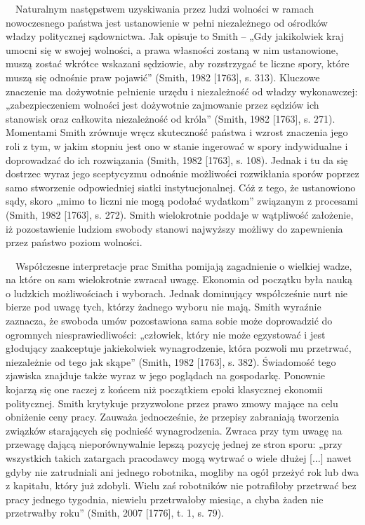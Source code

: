 \documentclass[a4paper]{article}
\begin{document}
 \ \ Naturalnym następstwem uzyskiwania przez ludzi wolności w ramach nowoczesnego państwa jest ustanowienie w pełni niezależnego od ośrodków władzy politycznej sądownictwa. Jak opisuje to Smith – „Gdy jakikolwiek kraj umocni się w swojej wolności, a prawa własności zostaną w nim ustanowione, muszą zostać wkrótce wskazani sędziowie, aby rozstrzygać te liczne spory, które muszą się odnośnie praw pojawić” \label{ref:RNDkH7t6CSI0T}(Smith, 1982 [1763], s. 313). Kluczowe znaczenie ma dożywotnie pełnienie urzędu i niezależność od władzy wykonawczej: „zabezpieczeniem wolności jest dożywotnie zajmowanie przez sędziów ich stanowisk oraz całkowita niezależność od króla” \label{ref:RNDQY5dE7difr}(Smith, 1982 [1763], s. 271). Momentami Smith zrównuje wręcz skuteczność państwa i wzrost znaczenia jego roli z tym, w jakim stopniu jest ono w stanie ingerować w spory indywidualne i doprowadzać do ich rozwiązania \label{ref:RNDK9nA5CA9CU}(Smith, 1982 [1763], s. 108). Jednak i tu da się dostrzec wyraz jego sceptycyzmu odnośnie możliwości rozwikłania sporów poprzez samo stworzenie odpowiedniej siatki instytucjonalnej. Cóż z tego, że ustanowiono sądy, skoro „mimo to liczni nie mogą podołać wydatkom” związanym z procesami \label{ref:RNDfgTZLS43gg}(Smith, 1982 [1763], s. 272). Smith wielokrotnie poddaje w wątpliwość założenie, iż pozostawienie ludziom swobody stanowi najwyższy możliwy do zapewnienia przez państwo poziom wolności.

\ \ Współczesne interpretacje prac Smitha pomijają zagadnienie o wielkiej wadze, na które on sam wielokrotnie zwracał uwagę. Ekonomia od początku była nauką o ludzkich możliwościach i wyborach. Jednak dominujący współcześnie nurt nie bierze pod uwagę tych, którzy żadnego wyboru nie mają. Smith wyraźnie zaznacza, że swoboda umów pozostawiona sama sobie może doprowadzić do ogromnych niesprawiedliwości: „człowiek, który nie może egzystować i jest głodujący zaakceptuje jakiekolwiek wynagrodzenie, która pozwoli mu przetrwać, niezależnie od tego jak skąpe” \label{ref:RNDIiGLDa4lxS}(Smith, 1982 [1763], s. 382). Świadomość tego zjawiska znajduje także wyraz w jego poglądach na gospodarkę. Ponownie kojarzą się one raczej z końcem niż początkiem epoki klasycznej ekonomii politycznej. Smith krytykuje przyzwolone przez prawo zmowy mające na celu obniżenie ceny pracy. Zauważa jednocześnie, że przepisy zabraniają tworzenia związków starających się podnieść wynagrodzenia. Zwraca przy tym uwagę na przewagę dającą nieporównywalnie lepszą pozycję jednej ze stron sporu: „przy wszystkich takich zatargach pracodawcy mogą wytrwać o wiele dłużej [...] nawet gdyby nie zatrudniali ani jednego robotnika, mogliby na ogół przeżyć rok lub dwa z kapitału, który już zdobyli. Wielu zaś robotników nie potrafiłoby przetrwać bez pracy jednego tygodnia, niewielu przetrwałoby miesiąc, a chyba żaden nie przetrwałby roku” \label{ref:RND1j5HGSGWhu}(Smith, 2007 [1776], t. 1, s. 79).
\end{document}
